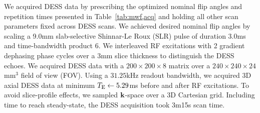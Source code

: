 We acquired DESS data
by prescribing the optimized nominal flip angles and repetition times
presented in Table~\ref{tab:mwf,acq}
and holding all other scan parameters fixed
across DESS scans.
We achieved desired nominal flip angles
by scaling a 9.0mm slab-selective Shinnar-Le Roux (SLR) pulse \cite{pauly:91:prf}
of duration 3.0ms and time-bandwidth product 6.
We interleaved RF excitations 
with 2 gradient dephasing phase cycles
over a 3mm slice thickness
to distinguish the DESS echoes.
We acquired DESS data
with a $200\times200\times8$ matrix
over a $240\times240\times24$mm$^3$ field of view (FOV).
Using a $31.25$kHz readout bandwidth,
we acquired 3D axial DESS data at minimum $T_\mathrm{E} \gets 5.29$ms
before and after RF excitations.
To avoid slice-profile effects,
we sampled $\mathbf{k}$-space over a 3D Cartesian grid.
Including time to reach steady-state,
the DESS acquisition took 3m15s scan time.


